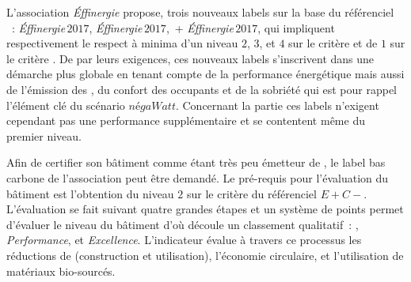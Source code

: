 L’association \textit{Éffinergie} propose, trois nouveaux labels sur la base du référenciel
~:  \textit{Éffinergie}\,$2017$,  \textit{Éffinergie}\,$2017$,
\,+ \textit{Éffinergie}\,$2017$, qui impliquent respectivement le respect à
minima d’un niveau $2$, $3$, et $4$ sur le critère  et de $1$ sur le critère .
De par leurs exigences, ces nouveaux labels s’inscrivent dans une
démarche plus globale en tenant compte de la performance énergétique mais aussi de
l’émission des , du confort des occupants et de la sobriété qui est pour rappel
l’élément clé du scénario $négaWatt$.
Concernant la partie  ces labels n’exigent cependant pas une performance
supplémentaire et se contentent même du premier niveau.

Afin de certifier son bâtiment comme étant très peu émetteur de , le label bas carbone de l’association
peut être demandé. Le pré-requis pour l’évaluation du bâtiment est l’obtention
du niveau $2$ sur le critère  du référenciel $E+C-$. L’évaluation se fait
suivant quatre grandes étapes et un système de points permet d’évaluer le niveau du
bâtiment d’où découle un classement qualitatif~: , 
\textit{Performance}, et  \textit{Excellence}. L’indicateur évalue à travers ce
processus les réductions de  (construction et utilisation), l’économie
circulaire, et l’utilisation de matériaux bio-sourcés.

